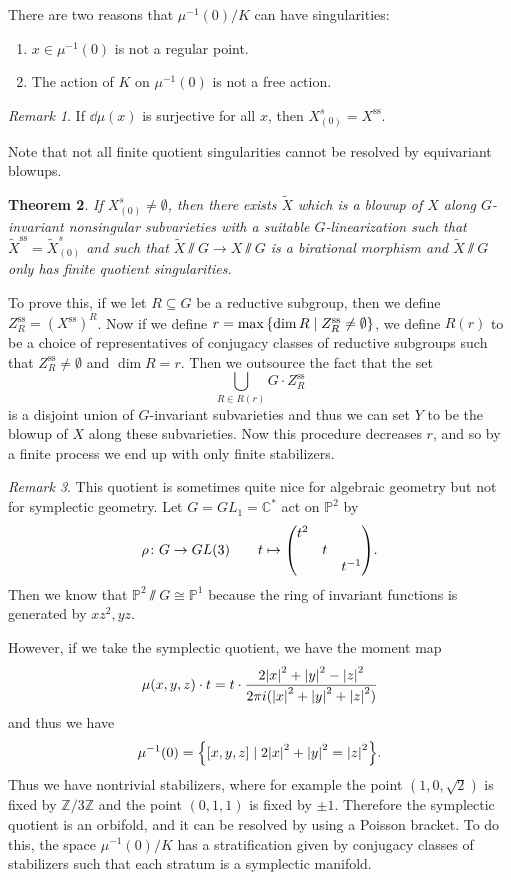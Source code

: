 \documentclass[leqno, openany]{memoir}
\newtheorem{thm}{Theorem}[section]
\theoremstyle{definition}
\theoremstyle{remark}
\newtheorem{rmk}[thm]{Remark}
\theoremstyle{plain}
\theoremstyle{definition}
\theoremstyle{remark}
\newcommand{\C}{\mathbb{C}}
\newcommand{\Z}{\mathbb{Z}}
\renewcommand{\P}{\mathbb{P}}
\newcommand{\mr}[1]{\mathrm{#1}}
\newcommand{\wt}[1]{\widetilde{#1}}
\begin{document}
There are two reasons that $\mu^{-1}(0)/K$ can have singularities:
\begin{enumerate}
    \item $x \in \mu^{-1}(0)$ is not a regular point.
    \item The action of $K$ on $\mu^{-1}(0)$ is not a free action.
\end{enumerate}

\begin{rmk}
    If $\dd{\mu}(x)$ is surjective for all $x$, then $X_{(0)}^s = X^{\mr{ss}}$.
\end{rmk}

Note that not all finite quotient singularities cannot be resolved by equivariant blowups.

\begin{thm}
    If $X_{(0)}^s \neq \emptyset$, then there exists $\wt{X}$ which is a blowup of $X$ along $G$-invariant nonsingular subvarieties with a suitable $G$-linearization such that $\wt{X}^{\mr{ss}} = \wt{X}_{(0)}^s$ and such that $\wt{X} \sslash G \to X \sslash G$ is a birational morphism and $\wt{X} \sslash G$ only has finite quotient singularities.
\end{thm}

To prove this, if we let $R \subseteq G$ be a reductive subgroup, then we define $Z_R^{\mr{ss}} = (X^{\mr{ss}})^R$. Now if we define $r = \max \qty{ \dim R \mid Z_R^{\mr{ss}} \neq \emptyset }$, we define $R(r)$ to be a choice of representatives of conjugacy classes of reductive subgroups such that $Z_R^{\mr{ss}} \neq \emptyset$ and $\dim R = r$. Then we outsource the fact that the set
\[ \bigcup_{R \in R(r)} G \cdot Z_R^{\mr{ss}} \]
is a disjoint union of $G$-invariant subvarieties and thus we can set $Y$ to be the blowup of $X$ along these subvarieties. Now this procedure decreases $r$, and so by a finite process we end up with only finite stabilizers.

\begin{rmk}
    This quotient is sometimes quite nice for algebraic geometry but not for symplectic geometry. Let $G = GL_1 = \C^*$ act on $\P^2$ by
    \[ \rho \colon G \to GL(3) \qquad t \mapsto \mqty(\dmat{t^2, t, t^{-1}}). \]
    Then we know that $\P^2 \sslash G \cong \P^1$ because the ring of invariant functions is generated by $xz^2, yz$.

    However, if we take the symplectic quotient, we have the moment map
    \[ \mu(x,y,z) \cdot t = t \cdot \frac{2 \abs{x}^2 + \abs{y}^2 - \abs{z}^2}{2 \pi i (\abs{x}^2 + \abs{y}^2 + \abs{z}^2)} \]
    and thus we have 
    \[ \mu^{-1}(0) = \qty{ [x,y,z] \mid 2 \abs{x}^2 + \abs{y}^2 = \abs{z}^2 }. \]
    Thus we have nontrivial stabilizers, where for example the point $(1, 0, \sqrt{2})$ is fixed by $\Z/3\Z$ and the point $(0,1,1)$ is fixed by $\pm 1$. Therefore the symplectic quotient is an orbifold, and it can be resolved by using a Poisson bracket. To do this, the space $\mu^{-1}(0)/K$ has a stratification given by conjugacy classes of stabilizers such that each stratum is a symplectic manifold.
\end{rmk}
\end{document}
